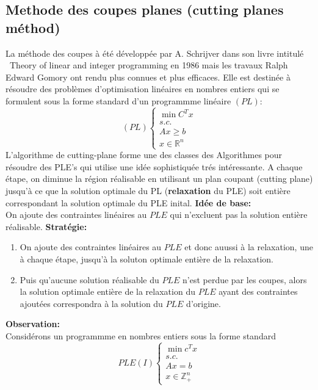 \documentclass[a4paper,11pt,oneside]{report}
\theoremstyle{plain}
\newcommand{\0}{/ \! \! \! 0}
\theoremstyle{plain}
\begin{document}
\subsection{Methode des coupes planes (cutting planes m\'ethod)}
La m\'ethode des coupes \`a \'et\'e d\'evelopp\'ee par A. Schrijver dans son livre intitul\'e {\ Theory of linear and integer programming} en 1986 mais 
les travaux Ralph Edward Gomory ont rendu plus connues et plus efficaces. Elle est destin\'ee \`a r\'esoudre des probl\`emes d'optimisation
lin\'eaires en nombres entiers qui se formulent sous la forme standard d'un programmme lin\'eaire $(PL)$:\\
\begin{equation}
    (PL)  \left\{\begin{array}{l}
               \min C^T x  \\
               s.c.         \\
               Ax \geq b     \\
               x\in \mathbb{R}^n
              \end{array}
      \right.
\end{equation}
L'algorithme de cutting-plane forme une des classes des Algorithmes pour r\'esoudre des PLE's qui utilise une id\'ee sophistiqu\'ee tr\'es
int\'eressante. A chaque \'etape, on diminue la r\'egion r\'ealisable en utilisant un plan coupant (cutting plane) jusqu'\`a ce que la solution 
optimale du PL ({\bfseries relaxation} du PLE) soit enti\`ere correspondant la solution optimale du PLE inital.
{\bf Id\'ee de base: }\\
On ajoute des contraintes lin\'eaires au $PLE$ qui n'excluent pas la solution enti\`ere r\'ealisable.
{\bf Strat\'egie:}
\begin{enumerate}
 \item On ajoute des contraintes lin\'eaires au $PLE$ et donc auussi \`a la relaxation, une \`a chaque \'etape, jusqu'\`a la soluton optimale 
  enti\`ere de la relaxation.
 \item Puis qu'aucune solution r\'ealisable du $PLE$ n'est perdue par les coupes, alors la solution optimale enti\`ere de la relaxation du $PLE$ ayant
 des contraintes ajout\'ees correspondra \`a la solution du $PLE$ d'origine.
\end{enumerate}
 {\bf Observation:}\\
 Consid\'erons un programmme en nombres entiers sous la forme standard
 \begin{equation}
  PLE(I) \left\{\begin{array}{l}
                \min  c^Tx  \\
                s.c.         \\
                Ax = b        \\
                x \in \mathbb{Z}_+^n
               \end{array} 
         \right.
 \end{equation}
\end{document}
